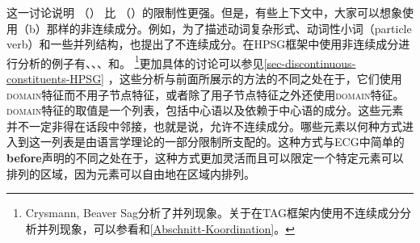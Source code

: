 这一讨论说明 （） 比 （）的限制性更强。但是，有些上下文中，大家可以想象使用（b）那样的非连续成分。例如，为了描述动词复杂形式、动词性小词（particle verb）和一些并列结构，也提出了不连续成分\citep{Wells47a}。在HPSG\indexhpsgc 框架中使用非连续成分进行分析的例子有、、、和。 \footnote{%
Crysmann, Beaver \biband Sag分析了并列现象。关于在TAG\indextagc 框架内使用不连续成分分析并列现象，可以参看和\ref{Abschnitt-Koordination}。%
	}更加具体的讨论可以参见\ref{sec-discontinuous-constituents-HPSG} ，这些分析与前面所展示的方法的不同之处在于，它们使用\textsc{domain}特征而不用子节点特征，或者除了用子节点特征之外还使用\textsc{domain}特征。\textsc{domain}特征的取值是一个列表，包括中心语以及依赖于中心语的成分。这些元素并不一定非得在话段中邻接，也就是说，允许不连续成分。哪些元素以何种方式进入到这一列表是由语言学理论的一部分限制所支配的。这种方式与ECG中简单的\textbf{before}声明的不同之处在于，这种方式更加灵活而且可以限定一个特定元素可以排列的区域，因为元素可以自由地在区域内排列。

